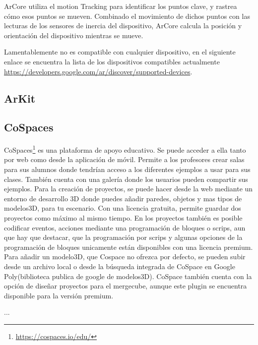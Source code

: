 ArCore utiliza el motion Tracking para identificar los puntos clave, y rastrea cómo esos puntos se mueven. Combinado el movimiento de dichos puntos con  las lecturas de los sensores de inercia del dispositivo, ArCore calcula la posición y orientación del dispositivo mientras se mueve.
\cite{google}

Lamentablemente no es compatible con cualquier dispositivo, en el siguiente enlace se encuentra la lista de los dispositivos compatibles actualmente \url{https://developers.google.com/ar/discover/supported-devices}.

\subsection{ArKit}
\subsection{CoSpaces} CoSpaces\footnote{\url{https://cospaces.io/edu/}} es una plataforma de apoyo educativo. Se puede acceder a ella tanto por web como desde la aplicación de móvil. Permite a los profesores crear salas para sus alumnos donde tendrían acceso a los diferentes ejemplos a usar para sus clases. También cuenta con una galería donde los usuarios pueden compartir sus ejemplos.
Para la creación de proyectos, se puede hacer desde la web mediante un entorno de desarrollo 3D donde puedes añadir paredes, objetos y mas tipos de modelos3D, para tu escenario. Con una licencia gratuita, permite guardar dos proyectos como máximo al mismo tiempo. En los proyectos también es posible codificar eventos, acciones mediante una programación de bloques o scrips, aun que hay que destacar, que la programación por scrips y algunas opciones de la programación de bloques unicamente están disponibles con una licencia premium. Para añadir un modelo3D, que Cospace no ofrezca por defecto, se pueden subir desde un archivo local o desde la búsqueda integrada de CoSpace en Google Poly(biblioteca publica de google de modelos3D).
CoSpace también cuenta con la opción de diseñar proyectos para el mergecube, aunque este plugin se encuentra disponible para la versión premium.

...

